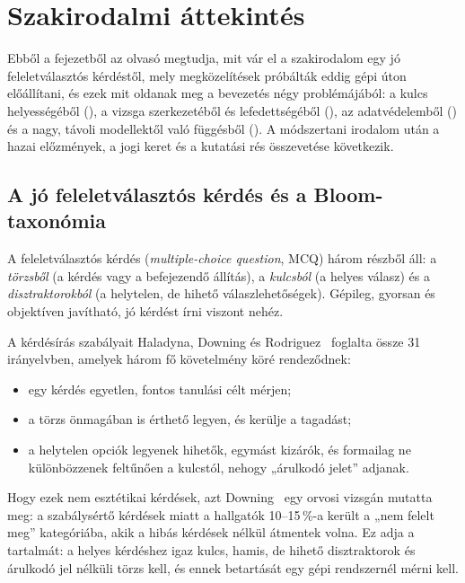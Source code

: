 \chapter{Szakirodalmi áttekintés}
\label{ch:szakirodalom}

Ebből a fejezetből az olvasó megtudja, mit vár el a szakirodalom egy jó feleletválasztós kérdéstől, mely
megközelítések próbálták eddig gépi úton előállítani, és ezek mit oldanak meg a bevezetés négy
problémájából: a kulcs helyességéből (), a vizsga szerkezetéből és lefedettségéből (), az
adatvédelemből () és a nagy, távoli modellektől való függésből (). A módszertani irodalom után a
hazai előzmények, a jogi keret és a kutatási rés összevetése következik.

\section{A jó feleletválasztós kérdés és a Bloom-taxonómia}
\label{sec:irod-mcq}

A feleletválasztós kérdés (\emph{multiple-choice question}, MCQ) három részből áll: a \emph{törzsből}
(a kérdés vagy a befejezendő állítás), a \emph{kulcsból} (a helyes válasz) és a
\emph{disztraktorokból} (a helytelen, de hihető válaszlehetőségek). Gépileg, gyorsan és objektíven
javítható, jó kérdést írni viszont nehéz.

A kérdésírás szabályait Haladyna, Downing és Rodriguez~\cite{haladyna2002review} foglalta össze 31
irányelvben, amelyek három fő követelmény köré rendeződnek:
\begin{itemize}[leftmargin=*,itemsep=1pt,topsep=2pt]
\item egy kérdés egyetlen, fontos tanulási célt mérjen;
\item a törzs önmagában is érthető legyen, és kerülje a tagadást;
\item a helytelen opciók legyenek hihetők, egymást kizárók, és formailag ne különbözzenek feltűnően a kulcstól, nehogy „árulkodó jelet” adjanak.
\end{itemize}
Hogy ezek nem esztétikai kérdések, azt
Downing~\cite{downing2005effects} egy orvosi vizsgán mutatta meg: a szabálysértő kérdések miatt a hallgatók
10--15\,\%-a került a „nem felelt meg” kategóriába, akik a hibás kérdések nélkül átmentek volna. Ez adja
a  tartalmát: a helyes kérdéshez igaz kulcs, hamis, de hihető disztraktorok és árulkodó jel nélküli
törzs kell, és ennek betartását egy gépi rendszernél mérni kell.


